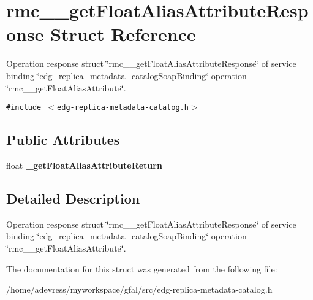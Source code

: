 \section{rmc\_\-\_\-get\-Float\-Alias\-Attribute\-Response Struct Reference}
\label{structrmc____getFloatAliasAttributeResponse}
Operation response struct \char`\"{}rmc\_\-\_\-get\-Float\-Alias\-Attribute\-Response\char`\"{} of service binding \char`\"{}edg\_\-replica\_\-metadata\_\-catalog\-Soap\-Binding\char`\"{} operation \char`\"{}rmc\_\-\_\-get\-Float\-Alias\-Attribute\char`\"{}.  


{\tt \#include $<$edg-replica-metadata-catalog.h$>$}

\subsection*{Public Attributes}
\begin{CompactItemize}
\item 
float \textbf{\_\-get\-Float\-Alias\-Attribute\-Return}\label{structrmc____getFloatAliasAttributeResponse_d4b9fcd857ab623141d490ef6dda1d2d}

\end{CompactItemize}


\subsection{Detailed Description}
Operation response struct \char`\"{}rmc\_\-\_\-get\-Float\-Alias\-Attribute\-Response\char`\"{} of service binding \char`\"{}edg\_\-replica\_\-metadata\_\-catalog\-Soap\-Binding\char`\"{} operation \char`\"{}rmc\_\-\_\-get\-Float\-Alias\-Attribute\char`\"{}. 



The documentation for this struct was generated from the following file:\begin{CompactItemize}
\item 
/home/adevress/myworkspace/gfal/src/edg-replica-metadata-catalog.h\end{CompactItemize}
